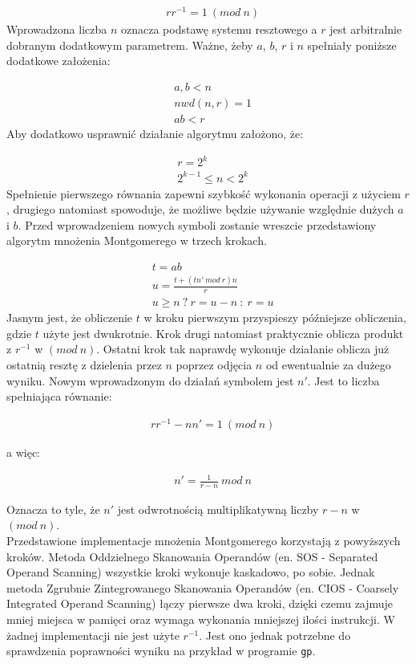 \documentclass[10pt,journal,compsoc]{IEEEtran}
\begin{document}
\begin{align*}
  &rr^{-1}=1\ (mod\ n)
\end{align*}
\noindent
Wprowadzona liczba $n$ oznacza podstawę systemu resztowego a $r$ jest arbitralnie dobranym dodatkowym parametrem. Ważne, żeby $a$, $b$, $r$ i $n$ spełniały poniższe dodatkowe założenia:  

\begin{align*}
   &a, b < n  \\
   &nwd(n,r) = 1  \\
   &ab < r 
\end{align*}
\noindent
Aby dodatkowo usprawnić działanie algorytmu założono, że:

\begin{align*}
  &r = 2^k \\
  &2^{k-1} \leq n < 2^k 
\end{align*}
\noindent
Spełnienie pierwszego równania zapewni szybkość wykonania operacji z użyciem $r$, drugiego natomiast spowoduje, że możliwe będzie używanie względnie dużych $a$ i $b$. Przed wprowadzeniem nowych symboli zostanie wreszcie przedstawiony algorytm mnożenia Montgomerego w trzech krokach. 

\begin{align*}
  &t = ab\\
  &u = \frac{t+(tn'\ mod\ r)n}{r}\\
  &u \geq n\ ?\ r = u-n\ :\ r = u
\end{align*}
\noindent
Jasnym jest, że obliczenie $t$ w kroku pierwszym przyspieszy późniejsze obliczenia, gdzie $t$ użyte jest dwukrotnie. Krok drugi natomiast praktycznie oblicza produkt z $r^{-1}$ w $(mod\ n)$. Ostatni krok tak naprawdę wykonuje działanie oblicza już ostatnią resztę z dzielenia przez $n$ poprzez odjęcia $n$ od ewentualnie za dużego wyniku. Nowym wprowadzonym do działań symbolem jest $n'$. Jest to liczba spełniająca równanie:

\begin{align*}
  &rr^{-1}-nn'=1\ (mod\ n)
\end{align*}

a więc:

\begin{align*}
  &n'= \frac{1}{r-n}\ mod\ n
\end{align*}

\noindent
Oznacza to tyle, że $n'$ jest odwrotnością multiplikatywną liczby $r-n$ w $(mod\ n)$. \\ \newline
Przedstawione implementacje mnożenia Montgomerego korzystają z powyższych kroków. Metoda Oddzielnego Skanowania Operandów (en. SOS - Separated Operand Scanning) wszystkie kroki wykonuje kaskadowo, po sobie. Jednak metoda Zgrubnie Zintegrowanego Skanowania Operandów (en. CIOS - Coarsely Integrated Operand Scanning) łączy pierwsze dwa kroki, dzięki czemu zajmuje mniej miejsca w pamięci oraz wymaga wykonania mniejszej ilości instrukcji. W żadnej implementacji nie jest użyte $r^{-1}$. Jest ono jednak potrzebne do sprawdzenia poprawności wyniku na przykład w programie \texttt{gp}.
\end{document}
